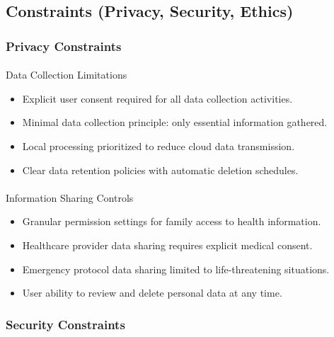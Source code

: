 \documentclass[
  letterpaper,
  DIV=11,
  numbers=noendperiod]{scrartcl}
\makeatletter
\let\oldparagraph\paragraph
\renewcommand{\paragraph}{
    \@ifstar
      \xxxParagraphStar
      \xxxParagraphNoStar
  }
\newcommand{\xxxParagraphStar}[1]{\oldparagraph*{#1}\mbox{}}
\newcommand{\xxxParagraphNoStar}[1]{\oldparagraph{#1}\mbox{}}
\providecommand{\tightlist}{%
  \setlength{\itemsep}{0pt}\setlength{\parskip}{0pt}}\usepackage{longtable,booktabs,array}
\makeatother
\begin{document}
\subsection{Constraints (Privacy, Security,
Ethics)}\label{constraints-privacy-security-ethics}

\subsubsection{Privacy Constraints}\label{privacy-constraints}

\paragraph{Data Collection
Limitations}\label{data-collection-limitations}

\begin{itemize}
\tightlist
\item
  Explicit user consent required for all data collection activities.
\item
  Minimal data collection principle: only essential information
  gathered.
\item
  Local processing prioritized to reduce cloud data transmission.
\item
  Clear data retention policies with automatic deletion schedules.
\end{itemize}

\paragraph{Information Sharing
Controls}\label{information-sharing-controls}

\begin{itemize}
\tightlist
\item
  Granular permission settings for family access to health information.
\item
  Healthcare provider data sharing requires explicit medical consent.
\item
  Emergency protocol data sharing limited to life-threatening
  situations.
\item
  User ability to review and delete personal data at any time.
\end{itemize}

\subsubsection{Security Constraints}\label{security-constraints}
\end{document}
